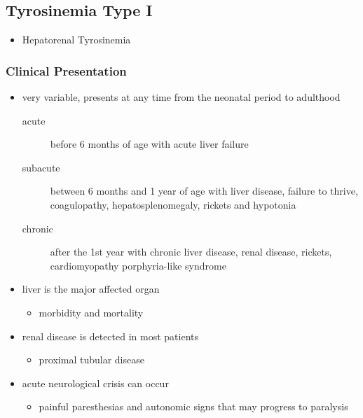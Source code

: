 \documentclass{scrartcl}
\begin{document}
\subsection{Tyrosinemia Type I}
\label{sec:org1c3d781}
\begin{itemize}
\item Hepatorenal Tyrosinemia
\end{itemize}
\subsubsection{Clinical Presentation}
\label{sec:orgdb50800}
\begin{itemize}
\item very variable, presents at any time from the neonatal period to adulthood
\begin{description}
\item[{acute}] before 6 months of age with acute liver failure
\item[{subacute}] between 6 months and 1 year of age with liver disease,
failure to thrive, coagulopathy, hepatosplenomegaly,
rickets and hypotonia
\item[{chronic}] after the 1st year with chronic liver disease, renal
disease, rickets, cardiomyopathy \textpm{} porphyria-like
syndrome
\end{description}

\item liver is the major affected organ
\begin{itemize}
\item morbidity and mortality
\end{itemize}
\item renal disease is detected in most patients
\begin{itemize}
\item proximal tubular disease
\end{itemize}
\item acute neurological crisis can occur
\begin{itemize}
\item painful paresthesias and autonomic signs that may progress to
paralysis
\end{itemize}
\end{itemize}
\end{document}
